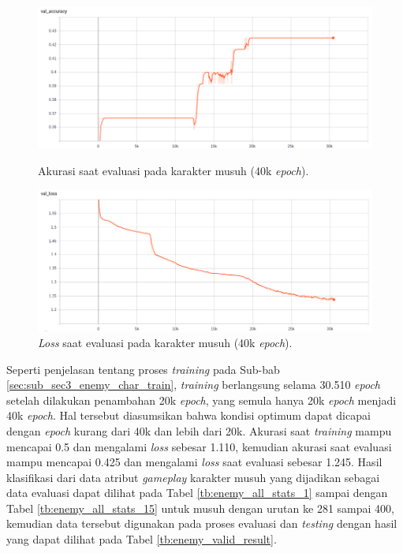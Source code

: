 \begin{figure} [!h] \centering
	\includegraphics[scale=0.42]{img/enemy_val_acc_40k_chap4.png}
	\caption{Akurasi saat evaluasi pada karakter musuh (40k \textit{epoch}).}
	\label{fig:nn_enemy_val_acc_40k_chap4}
	\vspace{4ex}
	
	\includegraphics[scale=0.42]{img/enemy_val_loss_40k_chap4.png}
	\caption{\textit{Loss} saat evaluasi pada karakter musuh (40k \textit{epoch}).}
	\label{fig:nn_enemy_val_loss_40k_chap4}
\end{figure}

Seperti penjelasan tentang proses \textit{training} pada Sub-bab \ref{sec:sub_sec3_enemy_char_train}, \textit{training} berlangsung selama 30.510 \textit{epoch} setelah dilakukan penambahan 20k \textit{epoch}, yang semula hanya 20k \textit{epoch} menjadi 40k \textit{epoch}. Hal tersebut diasumsikan bahwa kondisi optimum dapat dicapai dengan \textit{epoch} kurang dari 40k dan lebih dari 20k. Akurasi saat \textit{training} mampu mencapai 0.5 dan mengalami \textit{loss} sebesar 1.110, kemudian akurasi saat evaluasi mampu mencapai 0.425 dan mengalami \textit{loss} saat evaluasi sebesar 1.245. Hasil klasifikasi dari data atribut \textit{gameplay} karakter musuh yang dijadikan sebagai data evaluasi dapat dilihat pada Tabel \ref{tb:enemy_all_stats_1} sampai dengan Tabel \ref{tb:enemy_all_stats_15} untuk musuh dengan urutan ke 281 sampai 400, kemudian data tersebut digunakan pada proses evaluasi dan \textit{testing} dengan hasil yang dapat dilihat pada Tabel \ref{tb:enemy_valid_result}.
\vspace{-2ex}

